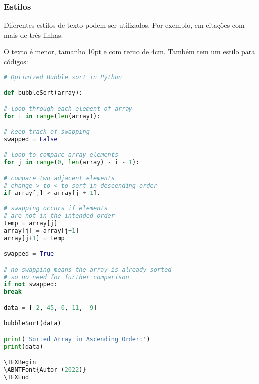 \subsubsection{Estilos}

Diferentes estilos de texto podem ser utilizados. Por exemplo, em citações com mais de três linhas:

\begin{ABNTCiteLong}
    \lipsum[1]
\end{ABNTCiteLong}

O texto é menor, tamanho 10pt e com recuo de 4cm. Também tem um estilo para códigos:


\begin{lstlisting}[language=Python, caption={Bubble Sort em Python.}]
# Optimized Bubble sort in Python

def bubbleSort(array):

# loop through each element of array
for i in range(len(array)):

# keep track of swapping
swapped = False

# loop to compare array elements
for j in range(0, len(array) - i - 1):

# compare two adjacent elements
# change > to < to sort in descending order
if array[j] > array[j + 1]:

# swapping occurs if elements
# are not in the intended order
temp = array[j]
array[j] = array[j+1]
array[j+1] = temp

swapped = True

# no swapping means the array is already sorted
# so no need for further comparison
if not swapped:
break

data = [-2, 45, 0, 11, -9]

bubbleSort(data)

print('Sorted Array in Ascending Order:')
print(data)

\TEXBegin
\ABNTFont{Autor (2022)}
\TEXEnd
\end{lstlisting}
